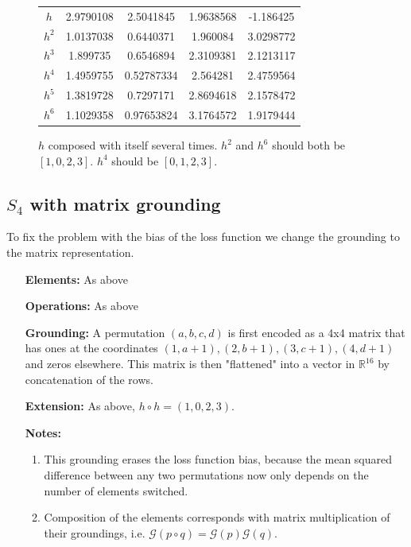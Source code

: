 \begin{figure}
\center
\caption{$h$ composed with itself several times. $h^2$ and $h^6$ should both be $[1,0,2,3]$. $h^4$ should be $[0,1,2,3]$.}
\label{table:s4_half_basic_gen}
\begin{tabular}{c|cccc}
$h$   & 2.9790108 & 2.5041845 & 1.9638568 & -1.186425\\
$h^2$ & 1.0137038 & 0.6440371 & 1.960084 & 3.0298772\\
$h^3$ & 1.899735 & 0.6546894 & 2.3109381 & 2.1213117\\
$h^4$ & 1.4959755 & 0.52787334 & 2.564281 & 2.4759564\\
$h^5$ & 1.3819728 & 0.7297171 & 2.8694618 & 2.1578472\\
$h^6$ & 1.1029358 & 0.97653824 & 3.1764572 & 1.9179444\\

\end{tabular}
\end{figure}

\subsection{$S_4$ with matrix grounding}
To fix the problem with the bias of the loss function we change the grounding to the matrix representation.

\begin{itemize}
	\item[\textbf{Elements:}] As above
	\item[\textbf{Operations:}] As above
	\item[\textbf{Grounding:}] A permutation $(a,b,c,d)$ is first encoded as a 4x4 matrix that has ones at the coordinates $(1,a+1),(2,b+1),(3,c+1),(4,d+1)$ and zeros elsewhere. This matrix is then "flattened" into a vector in $\mathbb{R}^{16}$ by concatenation of the rows.
	\item[\textbf{Extension:}] As above, $h\circ h=(1,0,2,3)$.
	\item[\textbf{Notes:}] 
	\begin{enumerate}

		\item This grounding erases the loss function bias, because the mean squared difference between any two permutations now only depends on the number of elements switched.
	
		\item Composition of the elements corresponds with matrix multiplication of their groundings, i.e. $\mathcal{G}(p\circ q)=\mathcal{G}(p)\mathcal{G}(q)$.	
	\end{enumerate}	
\end{itemize}

